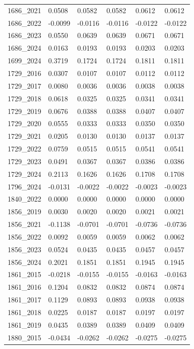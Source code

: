 \begin{table}[htbp]
\begin{tabular}{llllll}
1686_2021 & 0.0508 & 0.0582 & 0.0582 & 0.0612 & 0.0612 \\
1686_2022 & -0.0099 & -0.0116 & -0.0116 & -0.0122 & -0.0122 \\
1686_2023 & 0.0550 & 0.0639 & 0.0639 & 0.0671 & 0.0671 \\
1686_2024 & 0.0163 & 0.0193 & 0.0193 & 0.0203 & 0.0203 \\
1699_2024 & 0.3719 & 0.1724 & 0.1724 & 0.1811 & 0.1811 \\
1729_2016 & 0.0307 & 0.0107 & 0.0107 & 0.0112 & 0.0112 \\
1729_2017 & 0.0080 & 0.0036 & 0.0036 & 0.0038 & 0.0038 \\
1729_2018 & 0.0618 & 0.0325 & 0.0325 & 0.0341 & 0.0341 \\
1729_2019 & 0.0676 & 0.0388 & 0.0388 & 0.0407 & 0.0407 \\
1729_2020 & 0.0555 & 0.0333 & 0.0333 & 0.0350 & 0.0350 \\
1729_2021 & 0.0205 & 0.0130 & 0.0130 & 0.0137 & 0.0137 \\
1729_2022 & 0.0759 & 0.0515 & 0.0515 & 0.0541 & 0.0541 \\
1729_2023 & 0.0491 & 0.0367 & 0.0367 & 0.0386 & 0.0386 \\
1729_2024 & 0.2113 & 0.1626 & 0.1626 & 0.1708 & 0.1708 \\
1796_2024 & -0.0131 & -0.0022 & -0.0022 & -0.0023 & -0.0023 \\
1840_2022 & 0.0000 & 0.0000 & 0.0000 & 0.0000 & 0.0000 \\
1856_2019 & 0.0030 & 0.0020 & 0.0020 & 0.0021 & 0.0021 \\
1856_2021 & -0.1138 & -0.0701 & -0.0701 & -0.0736 & -0.0736 \\
1856_2022 & 0.0092 & 0.0059 & 0.0059 & 0.0062 & 0.0062 \\
1856_2023 & 0.0524 & 0.0435 & 0.0435 & 0.0457 & 0.0457 \\
1856_2024 & 0.2021 & 0.1851 & 0.1851 & 0.1945 & 0.1945 \\
1861_2015 & -0.0218 & -0.0155 & -0.0155 & -0.0163 & -0.0163 \\
1861_2016 & 0.1204 & 0.0832 & 0.0832 & 0.0874 & 0.0874 \\
1861_2017 & 0.1129 & 0.0893 & 0.0893 & 0.0938 & 0.0938 \\
1861_2018 & 0.0225 & 0.0187 & 0.0187 & 0.0197 & 0.0197 \\
1861_2019 & 0.0435 & 0.0389 & 0.0389 & 0.0409 & 0.0409 \\
1880_2015 & -0.0434 & -0.0262 & -0.0262 & -0.0275 & -0.0275 \\

\end{tabular}
\end{table}
